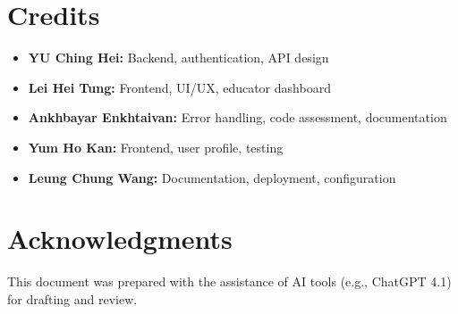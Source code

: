 \documentclass[a4paper,11pt]{scrartcl}
\begin{document}
\section{Credits}

\begin{itemize}[leftmargin=*]
    \item \textbf{YU Ching Hei:} Backend, authentication, API design
    \item \textbf{Lei Hei Tung:} Frontend, UI/UX, educator dashboard
    \item \textbf{Ankhbayar Enkhtaivan:} Error handling, code assessment, documentation
    \item \textbf{Yum Ho Kan:} Frontend, user profile, testing
    \item \textbf{Leung Chung Wang:} Documentation, deployment, configuration
\end{itemize}

\section{Acknowledgments}
This document was prepared with the assistance of AI tools (e.g., ChatGPT 4.1) for drafting and review.
\end{document}
